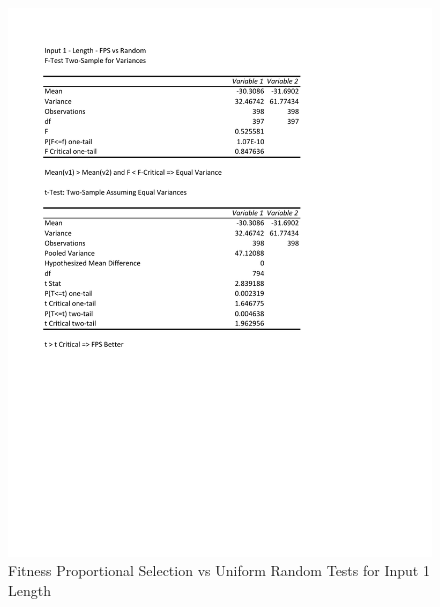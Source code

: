 \documentclass[times]{article}
\begin{document}
	\begin{figure}
		\caption{Fitness Proportional Selection vs Uniform Random Tests for Input 1 Length}
		\label{fig:1parent3}
		\includegraphics[width=\textwidth]{./t_test/1_parent3.pdf}
	\end{figure}
\end{document}
